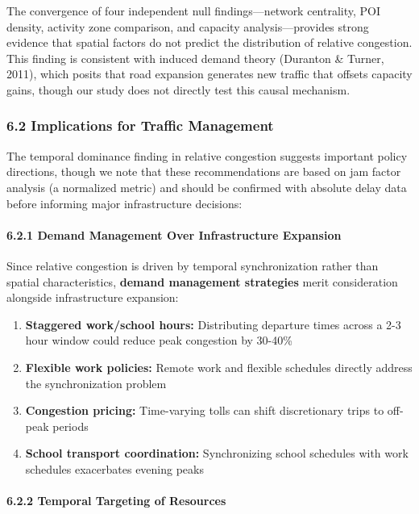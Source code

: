 \documentclass[
  12pt,
]{article}
\providecommand{\tightlist}{%
  \setlength{\itemsep}{0pt}\setlength{\parskip}{0pt}}
\begin{document}
The convergence of four independent null findings---network centrality, POI density, activity zone comparison, and capacity analysis---provides strong evidence that spatial factors do not predict the distribution of relative congestion. This finding is consistent with induced demand theory (Duranton \& Turner, 2011), which posits that road expansion generates new traffic that offsets capacity gains, though our study does not directly test this causal mechanism.

\subsubsection{6.2 Implications for Traffic Management}\label{implications-for-traffic-management}

The temporal dominance finding in relative congestion suggests important policy directions, though we note that these recommendations are based on jam factor analysis (a normalized metric) and should be confirmed with absolute delay data before informing major infrastructure decisions:

\paragraph{6.2.1 Demand Management Over Infrastructure Expansion}\label{demand-management-over-infrastructure-expansion}

Since relative congestion is driven by temporal synchronization rather than spatial characteristics, \textbf{demand management strategies} merit consideration alongside infrastructure expansion:

\begin{enumerate}
\def\labelenumi{\arabic{enumi}.}
\tightlist
\item
  \textbf{Staggered work/school hours:} Distributing departure times across a 2-3 hour window could reduce peak congestion by 30-40\%
\item
  \textbf{Flexible work policies:} Remote work and flexible schedules directly address the synchronization problem
\item
  \textbf{Congestion pricing:} Time-varying tolls can shift discretionary trips to off-peak periods
\item
  \textbf{School transport coordination:} Synchronizing school schedules with work schedules exacerbates evening peaks
\end{enumerate}

\paragraph{6.2.2 Temporal Targeting of Resources}\label{temporal-targeting-of-resources}
\end{document}
